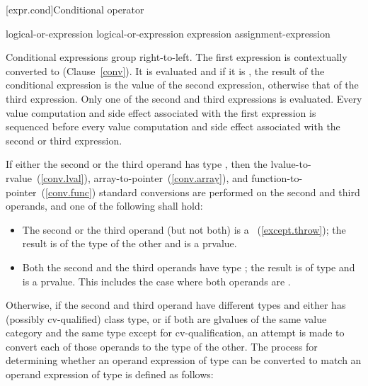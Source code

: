 [expr.cond]{Conditional operator}%
%
%
%

\begin{bnf}
\br
    logical-or-expression\br
    logical-or-expression  expression \terminal{:} assignment-expression
\end{bnf}

\pnum
Conditional expressions group right-to-left. The first expression is
contextually converted to 
(Clause~\ref{conv}). It is
evaluated and if it is , the result of the conditional
expression is the value of the second expression, otherwise that of the
third expression. Only one of the second and third expressions is
evaluated. Every
%
value computation and side effect associated with the
first expression is sequenced before every value computation and side
effect associated with the second or third expression.

\pnum
If either the second or the third operand has type ,
then the lvalue-to-rvalue~(\ref{conv.lval}),
array-to-pointer~(\ref{conv.array}), and
function-to-pointer~(\ref{conv.func}) standard conversions are performed
on the second and third operands, and one of the following shall hold:

\begin{itemize}
%
\item The second or the third operand (but not both) is a
~(\ref{except.throw}); the result is of the
type of the other and is a prvalue.

\item Both the second and the third operands have type ; the
result is of type  and is a prvalue. \enternote This
includes the case where both operands are .
\exitnote
\end{itemize}

\pnum
Otherwise, if the second and third operand have different types and
either has (possibly cv-qualified) class type, or if both
are glvalues of the same value category and the same type except for
cv-qualification, an attempt is made to
convert each of those operands to the type of the other. The process for
determining whether an operand expression  of type 
can be converted to match an operand expression  of type
 is defined as follows:

